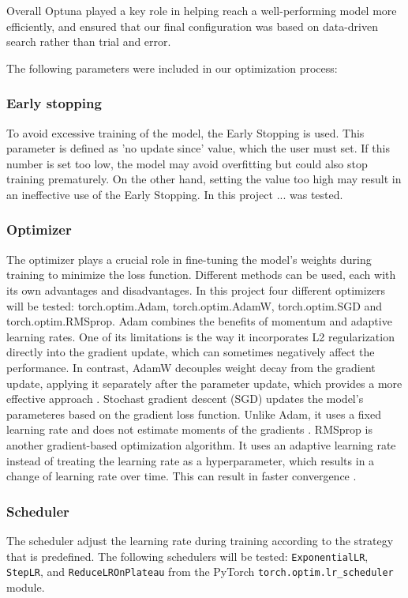 \documentclass[twocolumn]{article}
\begin{document}
Overall Optuna played a key role in helping reach a well-performing model more efficiently, and ensured that our final configuration was based on data-driven search rather than trial and error.

The following parameters were included in our optimization process:

\subsubsection{Early stopping}
To avoid excessive training of the model, the Early Stopping is used. This parameter is defined as 'no update since' value, which the user must set. If this number is set too low, the model may avoid overfitting but could also stop training prematurely. On the other hand, setting the value too high may result in an ineffective use of the Early Stopping. In this project ... was tested.

\subsubsection{Optimizer}
The optimizer plays a crucial role in fine-tuning the model's weights during training to minimize the loss function. Different methods can be used, each with its own advantages and disadvantages. In this project four different optimizers will be tested: torch.optim.Adam, torch.optim.AdamW, torch.optim.SGD and torch.optim.RMSprop. 
Adam combines the benefits of momentum and adaptive learning rates.  One of its limitations is the way it incorporates L2 regularization directly into the gradient update, which can sometimes negatively affect the performance. In contrast, AdamW decouples weight decay from the gradient update, applying it separately after the parameter update, which provides a more effective approach \cite{pykes-2021}.
Stochast gradient descent (SGD) updates the model's parameteres based on the gradient loss function. Unlike Adam, it uses a fixed learning rate and does not estimate moments of the gradients \cite{massed-compute-2025}.
RMSprop is another gradient-based optimization algorithm. It uses an adaptive learning rate instead of treating the learning rate as a hyperparameter, which results in a change of learning rate over time. This can result in faster convergence \cite{sanghvirajit-2025}.

\subsubsection{Scheduler} \label{subsec:Scheduler}
The scheduler adjust the learning rate during training according to the strategy that is predefined. The following schedulers will be tested: \texttt{ExponentialLR}, \texttt{StepLR}, and \texttt{ReduceLROnPlateau} from the PyTorch \texttt{torch.optim.lr\_scheduler} module.
\end{document}
